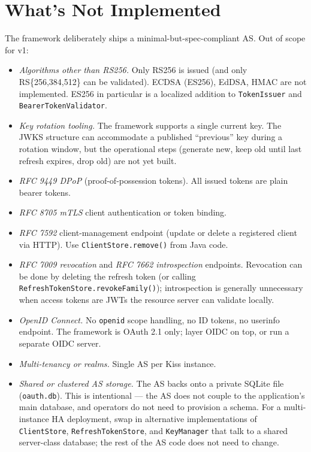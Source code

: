 \section{What's Not Implemented}
\label{sec:as-omissions}

The framework deliberately ships a minimal-but-spec-compliant AS.  Out of scope for v1:

\begin{itemize}
  \item \emph{Algorithms other than RS256.}  Only RS256 is issued (and only RS\{256,384,512\} can be validated).  ECDSA (ES256), EdDSA, HMAC are not implemented.  ES256 in particular is a localized addition to \texttt{TokenIssuer} and \texttt{Bearer\-Token\-Validator}.
  \item \emph{Key rotation tooling.}  The framework supports a single current key.  The JWKS structure can accommodate a published ``previous'' key during a rotation window, but the operational steps (generate new, keep old until last refresh expires, drop old) are not yet built.
  \item \emph{RFC 9449 DPoP} (proof-of-possession tokens).  All issued tokens are plain bearer tokens.
  \item \emph{RFC 8705 mTLS} client authentication or token binding.
  \item \emph{RFC 7592} client-management endpoint (update or delete a registered client via HTTP).  Use \texttt{ClientStore.remove()} from Java code.
  \item \emph{RFC 7009 revocation} and \emph{RFC 7662 introspection} endpoints.  Revocation can be done by deleting the refresh token (or calling \texttt{Refresh\-Token\-Store.revokeFamily()}); introspection is generally unnecessary when access tokens are JWTs the resource server can validate locally.
  \item \emph{OpenID Connect.}  No \texttt{openid} scope handling, no ID tokens, no userinfo endpoint.  The framework is OAuth 2.1 only; layer OIDC on top, or run a separate OIDC server.
  \item \emph{Multi-tenancy or realms.}  Single AS per Kiss instance.
  \item \emph{Shared or clustered AS storage.}  The AS backs onto a private SQLite file (\texttt{oauth.db}).  This is intentional --- the AS does not couple to the application's main database, and operators do not need to provision a schema.  For a multi-instance HA deployment, swap in alternative implementations of \texttt{ClientStore}, \texttt{RefreshTokenStore}, and \texttt{KeyManager} that talk to a shared server-class database; the rest of the AS code does not need to change.
\end{itemize}

